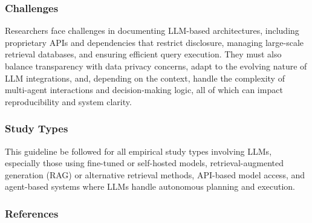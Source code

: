 \subsubsection{Challenges}

Researchers face challenges in documenting LLM-based architectures, including proprietary APIs and dependencies that restrict disclosure, managing large-scale retrieval databases, and ensuring efficient query execution. They must also balance transparency with data privacy concerns, adapt to the evolving nature of LLM integrations, and, depending on the context, handle the complexity of multi-agent interactions and decision-making logic, all of which can impact reproducibility and system clarity.

\subsubsection{Study Types}

This guideline \must be followed for all empirical study types involving LLMs, especially those using fine-tuned or self-hosted models, retrieval-augmented generation (RAG) or alternative retrieval methods, API-based model access, and agent-based systems where LLMs handle autonomous planning and execution.

\subsubsection{References}





